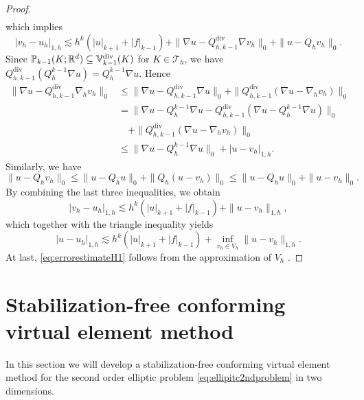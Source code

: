 \documentclass[10pt]{amsart}
\renewcommand{\div}{\operatorname{div}}
\numberwithin{equation}{section}
\begin{document}
\begin{proof}
\begin{align*}
\end{align*}
which implies
\[
|v_h-u_h|_{1,h}\lesssim h^k(|u|_{k+1}+|f|_{k-1})+\|\nabla u-Q_{h,k-1}^{\div}\nabla v_h\|_0+\|u-Q_hv_h\|_0.
\]
Since $\mathbb P_{k-1}(K;\mathbb R^d)\subseteq\mathbb{V}_{k-1}^{\rm div}(K)$ for $K\in\mathcal T_h$, we have $Q_{h,k-1}^{\div}(Q_h^{k-1}\nabla u)=Q_h^{k-1}\nabla u$. Hence
\begin{align*}    
\|\nabla u-Q_{h,k-1}^{\div}\nabla_h v_h\|_0&\leq \|\nabla u-Q_{h,k-1}^{\div}\nabla u\|_0+\|Q_{h,k-1}^{\div}(\nabla u-\nabla_h v_h)\|_0\\
&= \|\nabla u-Q_h^{k-1}\nabla u-Q_{h,k-1}^{\div}(\nabla u-Q_h^{k-1}\nabla u)\|_0\\
&\quad+\|Q_{h,k-1}^{\div}(\nabla u-\nabla_h v_h)\|_0 \\
&\leq \|\nabla u-Q_h^{k-1}\nabla u\|_0+|u-v_h|_{1,h}.
\end{align*}
Similarly, we have
\[
\|u-Q_hv_h\|_0\leq \|u-Q_hu\|_0+\|Q_h(u-v_h)\|_0\leq \|u-Q_hu\|_0+\|u-v_h\|_0.
\]
By combining the last three inequalities, we obtain
\[
|v_h-u_h|_{1,h}\lesssim h^k(|u|_{k+1}+|f|_{k-1})+\|u-v_h\|_{1,h},
\]
which together with the triangle inequality yields
\[
|u-u_h|_{1,h}\lesssim h^k(|u|_{k+1}+|f|_{k-1})+\inf_{v_h\in V_h}\|u-v_h\|_{1,h}.
\]
At last, \eqref{eq:errorestimateH1} follows from the approximation of $V_h$ \cite{ChenHuang2020ncvem}.
\end{proof}





\section{Stabilization-free conforming virtual element method}\label{sec:stabfreecfmvem}

In this section we will develop a stabilization-free conforming virtual element method for the second order elliptic problem \eqref{eq:ellipitc2ndproblem} in two dimensions.
\end{document}
